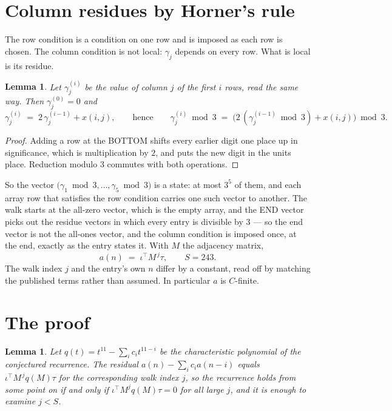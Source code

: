 \documentclass[11pt,a4paper]{article}
\theoremstyle{plain}
\newtheorem{lemma}[theorem]{Lemma}
\theoremstyle{definition}
\begin{document}
\section{Column residues by Horner's rule}

The row condition is a condition on one row and is imposed as each row is chosen. The column
condition is not local: $\gamma_j$ depends on every row. What is local is its residue.

\begin{lemma}\label{lem:horner}
Let $\gamma_j^{(i)}$ be the value of column $j$ of the first $i$ rows, read the same way.
Then $\gamma_j^{(0)}=0$ and
\[
\gamma_j^{(i)}\;=\;2\,\gamma_j^{(i-1)}+x(i,j),
\qquad\text{hence}\qquad
\gamma_j^{(i)}\bmod 3\;=\;
\bigl(2\,(\gamma_j^{(i-1)}\bmod 3)+x(i,j)\bigr)\bmod 3 .
\]
\end{lemma}

\begin{proof}
Adding a row at the BOTTOM shifts every earlier digit one place up in significance, which is
multiplication by $2$, and puts the new digit in the units place. Reduction modulo
$3$ commutes with both operations.
\end{proof}

So the vector $\bigl(\gamma_1\bmod 3,\dots,\gamma_{5}\bmod
3\bigr)$ is a state: at most $3^{5}$ of them, and each array row
that satisfies the row condition carries one such vector to another. The walk starts at the
all-zero vector, which is the empty array, and the END vector picks out the residue vectors in
which every entry is divisible by $3$ --- so the end vector is not the all-ones
vector, and the column condition is imposed once, at the end, exactly as the entry states it.
With $M$ the adjacency matrix,
\[
a(n)\;=\;\iota^{\!\top}M^{\,j}\tau ,\qquad S=243.
\]
The walk index $j$ and the entry's own $n$ differ by a constant, read off by matching the
published terms rather than assumed. In particular $a$ is $C$-finite.

\section{The proof}

\begin{lemma}\label{lem:crit}
Let $q(t)=t^{11}-\sum_i c_it^{11-i}$ be the characteristic polynomial of the
conjectured recurrence. The residual $a(n)-\sum_ic_ia(n-i)$ equals
$\iota^{\!\top}M^{\,j}q(M)\tau$ for the corresponding walk index $j$, so the recurrence
holds from some point on if and only if $\iota^{\!\top}M^{j}q(M)\tau=0$ for all large $j$,
and it is enough to examine $j<S$.
\end{lemma}
\end{document}
